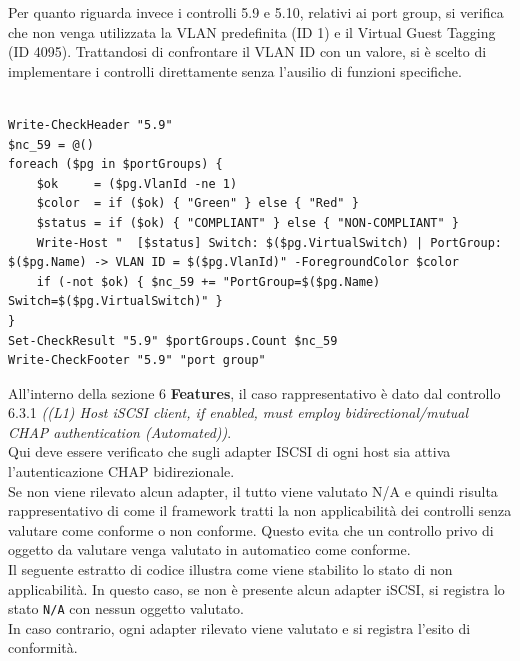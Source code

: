 \documentclass[a4paper,11pt]{report}
\begin{document}
Per quanto riguarda invece i controlli 5.9 e 5.10, relativi ai port group, si verifica che non venga utilizzata la VLAN predefinita (ID 1) e il Virtual Guest Tagging (ID 4095). Trattandosi di confrontare il VLAN ID con un valore, si è scelto di implementare i controlli direttamente senza l'ausilio di funzioni specifiche.


\begin{lstlisting}[style=azcli, caption={Controllo 5.9 di verifica sull'utilizzo della VLAN predefinita}, label={lst:vlan}]

Write-CheckHeader "5.9" 
$nc_59 = @()
foreach ($pg in $portGroups) {
    $ok     = ($pg.VlanId -ne 1)
    $color  = if ($ok) { "Green" } else { "Red" }
    $status = if ($ok) { "COMPLIANT" } else { "NON-COMPLIANT" }
    Write-Host "  [$status] Switch: $($pg.VirtualSwitch) | PortGroup: $($pg.Name) -> VLAN ID = $($pg.VlanId)" -ForegroundColor $color
    if (-not $ok) { $nc_59 += "PortGroup=$($pg.Name) Switch=$($pg.VirtualSwitch)" }
}
Set-CheckResult "5.9" $portGroups.Count $nc_59
Write-CheckFooter "5.9" "port group"
\end{lstlisting}

All'interno della sezione 6 \textbf{Features}, il caso rappresentativo è dato dal controllo 6.3.1 \textit{((L1) Host iSCSI client, if enabled, must employ bidirectional/mutual CHAP authentication (Automated))}. \\
Qui deve essere verificato che sugli adapter ISCSI di ogni host sia attiva l'autenticazione CHAP bidirezionale. \\
Se non viene rilevato alcun adapter, il tutto viene valutato N/A e quindi risulta rappresentativo di come il framework tratti la non applicabilità dei controlli senza valutare come conforme o non conforme. Questo evita che un controllo privo di oggetto da valutare venga valutato in automatico come conforme.\\

Il seguente estratto di codice illustra come viene stabilito lo stato di non applicabilità. In questo caso, se non è presente alcun adapter iSCSI, si registra lo stato \texttt{N/A} con nessun oggetto valutato.\\
In caso contrario, ogni adapter rilevato viene valutato e si registra l'esito di conformità.
\end{document}
